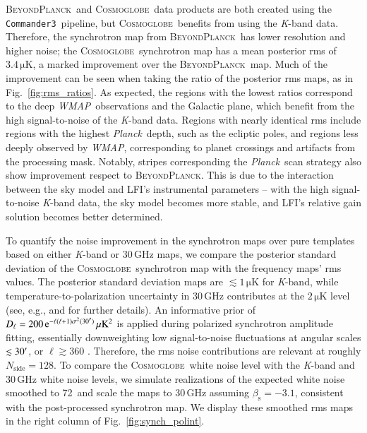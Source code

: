 \documentclass[twocolumn]{../../common/aa}
\def\WMAP{\emph{WMAP}}
\def\Planck{\emph{Planck}}
\def\commanderthree{\texttt{Commander3}}
\newcommand{\bp}{\textsc{BeyondPlanck}}
\newcommand{\cosmoglobe}{\textsc{Cosmoglobe}}
\newcommand{\K}[0]{\textit K}
\newcommand{\e}{\mathrm e}
\begin{document}
\bp\ and \cosmoglobe\ data products are both created using the \commanderthree\ pipeline, but \cosmoglobe\ benefits from using the \K-band data. Therefore, the synchrotron map from \bp\ has lower resolution and higher noise; the \cosmoglobe\ synchrotron map has a mean posterior rms of $3.4\,\mathrm{\mu K}$, a marked improvement over the \bp\ map.
Much of the improvement can be seen when taking the ratio of the posterior rms maps, as in Fig.~\ref{fig:rms_ratios}. As expected, the regions with the lowest ratios correspond to the deep \WMAP\ observations and the Galactic plane, which benefit from the high signal-to-noise of the \K-band data. Regions with nearly identical rms include regions with the highest \Planck\ depth, such as the ecliptic poles, and regions less deeply observed by \WMAP, corresponding to planet crossings and artifacts from the processing mask. Notably, stripes corresponding the \Planck\ scan strategy also show improvement respect to \bp. This is due to the interaction between the sky model and LFI's instrumental parameters -- with the high signal-to-noise \K-band data, the sky model becomes more stable, and LFI's relative gain solution becomes better determined.


To quantify the noise improvement in the synchrotron maps over pure templates based on either \K-band or 30\,GHz maps, we compare the posterior standard deviation of the \cosmoglobe\ synchrotron map with the frequency maps' rms values. The posterior standard deviation maps are $\lesssim1\,\mathrm{\mu K}$ for \K-band, while temperature-to-polarization uncertainty in 30\,GHz contributes at the $2\,\mathrm{\mu K}$ level (see, e.g., \citealp{watts2023_dr1} and \citealp{bp10} for further details). An informative prior of $D_\ell=200\,\e^{-\ell(\ell+1)\sigma^2(30\arcm)}\,\mathrm{\mu K^2}$ is applied during polarized synchrotron amplitude fitting, essentially downweighting low signal-to-noise fluctuations at angular scales $\lesssim30\arcm$, or $\ell\gtrsim360$ \citep{bp14}. Therefore, the rms noise contributions are relevant at roughly $N_\mathrm{side}=128$. To compare the \cosmoglobe\ white noise level with the \K-band and 30\,GHz white noise levels, we simulate realizations of the expected white noise smoothed to 72\arcm\ and scale the maps to 30\,GHz assuming $\beta_\mathrm s=-3.1$, consistent with the post-processed synchrotron map. We display these smoothed rms maps in the right column of Fig.~\ref{fig:synch_polint}.
\end{document}
